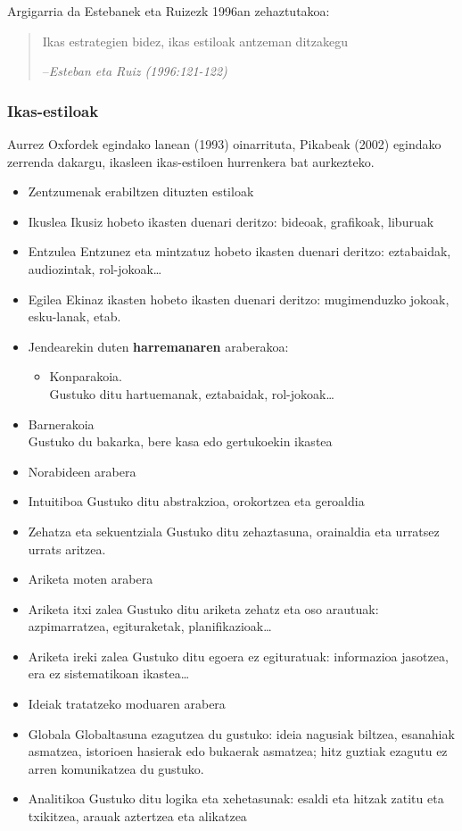 \documentclass[]{book}
\providecommand{\tightlist}{%
  \setlength{\itemsep}{0pt}\setlength{\parskip}{0pt}}
\begin{document}
Argigarria da Estebanek eta Ruizezk 1996an zehaztutakoa:

\begin{quote}
Ikas estrategien bidez, ikas estiloak antzeman ditzakegu

--\emph{Esteban eta Ruiz (1996:121-122)}
\end{quote}

\hypertarget{ikas-estiloak-1}{%
\subsubsection{Ikas-estiloak}\label{ikas-estiloak-1}}

Aurrez Oxfordek egindako lanean (1993) oinarrituta, Pikabeak (2002) egindako zerrenda dakargu, ikasleen ikas-estiloen hurrenkera bat aurkezteko.

\begin{itemize}
\tightlist
\item
  Zentzumenak erabiltzen dituzten estiloak
\item
  Ikuslea
  Ikusiz hobeto ikasten duenari deritzo: bideoak, grafikoak, liburuak
\item
  Entzulea
  Entzunez eta mintzatuz hobeto ikasten duenari deritzo: eztabaidak, audiozintak, rol-jokoak\ldots{}
\item
  Egilea
  Ekinaz ikasten hobeto ikasten duenari deritzo: mugimenduzko jokoak, esku-lanak, etab.
\item
  Jendearekin duten \textbf{harremanaren} araberakoa:

  \begin{itemize}
  \tightlist
  \item
    Konparakoia.\\
    Gustuko ditu hartuemanak, eztabaidak, rol-jokoak\ldots{}
  \end{itemize}
\item
  Barnerakoia\\
  Gustuko du bakarka, bere kasa edo gertukoekin ikastea
\item
  Norabideen arabera
\item
  Intuitiboa
  Gustuko ditu abstrakzioa, orokortzea eta geroaldia
\item
  Zehatza eta sekuentziala
  Gustuko ditu zehaztasuna, orainaldia eta urratsez urrats aritzea.
\item
  Ariketa moten arabera
\item
  Ariketa itxi zalea
  Gustuko ditu ariketa zehatz eta oso arautuak: azpimarratzea, egituraketak, planifikazioak\ldots{}
\item
  Ariketa ireki zalea
  Gustuko ditu egoera ez egituratuak: informazioa jasotzea, era ez sistematikoan ikastea\ldots{}
\item
  Ideiak tratatzeko moduaren arabera
\item
  Globala
  Globaltasuna ezagutzea du gustuko: ideia nagusiak biltzea, esanahiak asmatzea, istorioen hasierak edo bukaerak asmatzea; hitz guztiak ezagutu ez arren komunikatzea du gustuko.
\item
  Analitikoa
  Gustuko ditu logika eta xehetasunak: esaldi eta hitzak zatitu eta txikitzea, arauak aztertzea eta alikatzea
\end{itemize}
\end{document}
